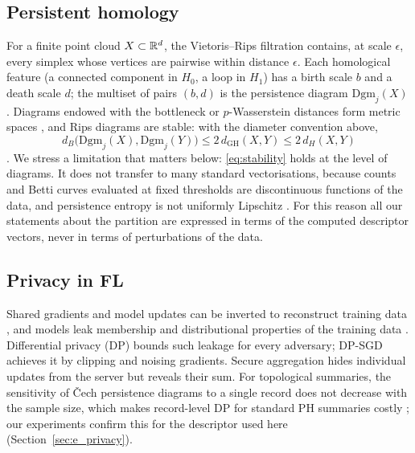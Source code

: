 \subsection{Persistent homology}
\label{sec:bg_ph}
For a finite point cloud $X\subset\mathbb{R}^d$, the Vietoris--Rips filtration contains, at scale
$\epsilon$, every simplex whose vertices are pairwise within distance $\epsilon$. Each
homological feature (a connected component in $H_0$, a loop in $H_1$) has a birth scale $b$
and a death scale $d$; the multiset of pairs $(b,d)$ is the persistence diagram
$\mathrm{Dgm}_j(X)$ \citep{edelsbrunner2010computational}. Diagrams endowed with the
bottleneck or $p$-Wasserstein distances form metric spaces
\citep{mileyko2011probability,turner2014frechet}, and Rips diagrams are stable: with the
diameter convention above,
\begin{equation}
  d_B\bigl(\mathrm{Dgm}_j(X),\mathrm{Dgm}_j(Y)\bigr)\le 2\,d_{\mathrm{GH}}(X,Y)\le 2\,d_H(X,Y)
  \label{eq:stability}
\end{equation}
\citep{chazal2009gromov,chazal2014persistence}. We stress a limitation that matters below:
\eqref{eq:stability} holds at the level of diagrams. It does not transfer to many standard
vectorisations, because counts and Betti curves evaluated at fixed thresholds are
discontinuous functions of the data, and persistence entropy is not uniformly Lipschitz
\citep{atienza2020stability}. For this reason all our statements about the partition are
expressed in terms of the computed descriptor vectors, never in terms of perturbations of
the data.

\subsection{Privacy in FL}
\label{sec:bg_privacy}
Shared gradients and model updates can be inverted to reconstruct training data
\citep{zhu2019deep,geiping2020inverting}, and models leak membership \citep{yeom2018privacy}
and distributional properties of the training data \citep{melis2019exploiting}.
Differential privacy (DP) \citep{dwork2014algorithmic} bounds such leakage for every
adversary; DP-SGD \citep{abadi2016deep,wei2020federated} achieves it by clipping and
noising gradients. Secure aggregation \citep[SecAgg;][]{bonawitz2017practical} hides
individual updates from the server but reveals their sum. For topological summaries, the
sensitivity of \v{C}ech persistence diagrams to a single record does not decrease with the
sample size, which makes record-level DP for standard PH summaries costly \citep{kang2024differentially}; our
experiments confirm this for the descriptor used here (Section~\ref{sec:e_privacy}).

